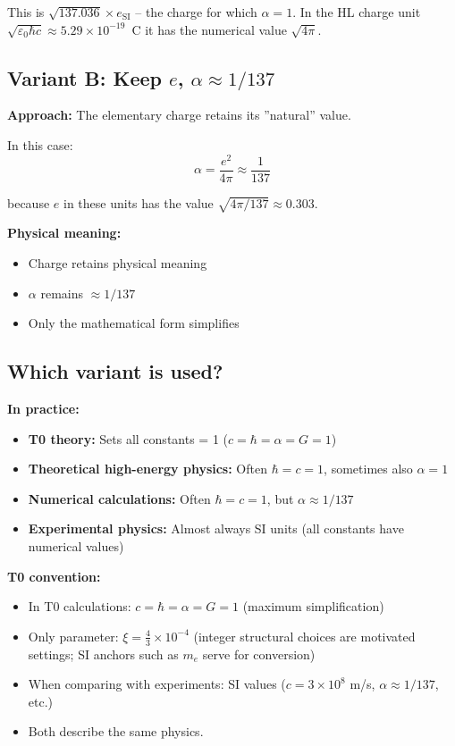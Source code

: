 	This is $\sqrt{137.036} \times e_{\text{SI}}$ -- the charge for which $\alpha = 1$. In the HL charge unit $\sqrt{\varepsilon_0\hbar c} \approx 5.29 \times 10^{-19}$~C it has the numerical value $\sqrt{4\pi}$.
	
	\subsection{Variant B: Keep $e$, $\alpha \approx 1/137$}
	
	\textbf{Approach:} The elementary charge retains its ''natural'' value.
	
	In this case:
	\begin{equation}
		\alpha = \frac{e^2}{4\pi} \approx \frac{1}{137}
	\end{equation}
	
	because $e$ in these units has the value $\sqrt{4\pi/137} \approx 0.303$.
	
	\textbf{Physical meaning:}
	\begin{itemize}
		\item Charge retains physical meaning
		\item $\alpha$ remains $\approx 1/137$
		\item Only the mathematical form simplifies
	\end{itemize}
	
	\subsection{Which variant is used?}
	
	\textbf{In practice:}
	\begin{itemize}
		\item \textbf{T0 theory:} Sets all constants = 1 ($c = \hbar = \alpha = G = 1$)
		\item \textbf{Theoretical high-energy physics:} Often $\hbar = c = 1$, sometimes also $\alpha = 1$
		\item \textbf{Numerical calculations:} Often $\hbar = c = 1$, but $\alpha \approx 1/137$
		\item \textbf{Experimental physics:} Almost always SI units (all constants have numerical values)
	\end{itemize}
	
	\textbf{T0 convention:}
	\begin{itemize}
		\item In T0 calculations: $c = \hbar = \alpha = G = 1$ (maximum simplification)
		\item Only parameter: $\xi = \frac{4}{3} \times 10^{-4}$ (integer structural choices are motivated settings; SI anchors such as $m_e$ serve for conversion)
		\item When comparing with experiments: SI values ($c = 3 \times 10^8$ m/s, $\alpha \approx 1/137$, etc.)
		\item Both describe the same physics.
	\end{itemize}
	
